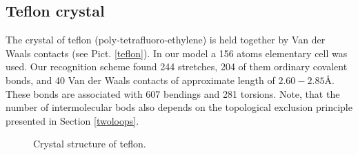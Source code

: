 \documentclass[prl,aps,preprint,superbib,12pt]{revtex4}
\begin{document}
\subsection{Teflon crystal}
The crystal of teflon (poly-tetrafluoro-ethylene) is held
together by Van der Waals contacts (see Pict. \ref{teflon}).
In our model a 156 atoms elementary cell was used.
Our recognition scheme found 244 stretches, 204 of them 
ordinary covalent bonds, and 40 Van der Waals contacts of approximate
length of $2.60-2.85$\AA. These bonds are associated with 607
bendings and 281 torsions. Note, that the number of intermolecular
bods also depends on the topological exclusion principle
presented in Section \ref{twoloops}.
\begin{figure}[h]
\caption{
Crystal structure of teflon.
\label{PETN}
}
\end{figure}
\end{document}

